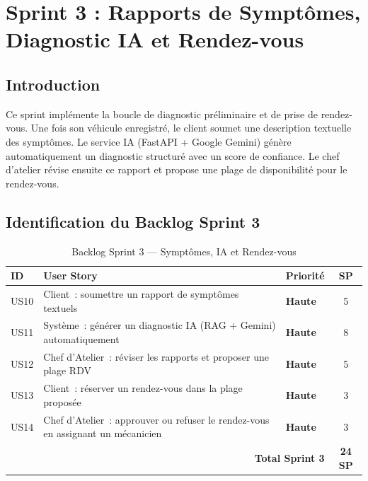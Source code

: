 \documentclass[12pt,a4paper]{report}
\begin{document}
\chapter{Sprint 3 : Rapports de Symptômes, Diagnostic IA et Rendez-vous}

\section{Introduction}

Ce sprint implémente la boucle de diagnostic préliminaire et de prise de rendez-vous.
Une fois son véhicule enregistré, le client soumet une description textuelle des
symptômes. Le service IA (FastAPI + Google Gemini) génère automatiquement un diagnostic
structuré avec un score de confiance. Le chef d'atelier révise ensuite ce rapport
et propose une plage de disponibilité pour le rendez-vous.

\section{Identification du Backlog Sprint 3}

\begin{table}[H]
\centering
\caption{Backlog Sprint 3 — Symptômes, IA et Rendez-vous}
\begin{tabularx}{\textwidth}{|l|X|l|c|}
\hline
\rowcolor{indigolite!60}
\textbf{ID} & \textbf{User Story} & \textbf{Priorité} & \textbf{SP} \\
\hline
US10 & Client~: soumettre un rapport de symptômes textuels &
  \textcolor{prioH}{\bfseries Haute} & 5 \\
\hline
US11 & Système~: générer un diagnostic IA (RAG + Gemini) automatiquement &
  \textcolor{prioH}{\bfseries Haute} & 8 \\
\hline
US12 & Chef d'Atelier~: réviser les rapports et proposer une plage RDV &
  \textcolor{prioH}{\bfseries Haute} & 5 \\
\hline
US13 & Client~: réserver un rendez-vous dans la plage proposée &
  \textcolor{prioH}{\bfseries Haute} & 3 \\
\hline
US14 & Chef d'Atelier~: approuver ou refuser le rendez-vous en assignant un mécanicien &
  \textcolor{prioH}{\bfseries Haute} & 3 \\
\hline
\multicolumn{3}{|r|}{\textbf{Total Sprint 3}} & \textbf{24 SP} \\
\hline
\end{tabularx}
\end{table}
\end{document}
